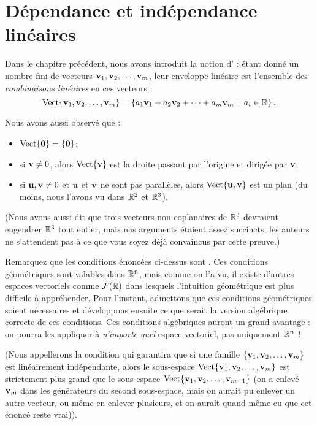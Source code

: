 \chapter{D\'ependance et ind\'ependance lin\'eaires}\label{chapter:Fr_07-independence}



Dans le chapitre pr\'ec\'edent, nous avons introduit la notion d' : étant donné un nombre fini de vecteurs $\mathbf{v}_1, \mathbf{v}_2, \ldots, \mathbf{v}_m$,
leur enveloppe lin\'eaire est l'ensemble des \emph{combinaisons linéaires} en ces vecteurs :
$$
\textrm{Vect}\{ \mathbf{v}_1, \mathbf{v}_2, \ldots, \mathbf{v}_m\} = \{ a_1\mathbf{v}_1 + a_2\mathbf{v}_2 + \cdots + a_m\mathbf{v}_m \, \mid \, a_i \in \mathbb{R}\}\,.
$$

Nous avons aussi observé que :
\begin{itemize}
\item  $\textrm{Vect}\{\mathbf{0}\} = \{ \mathbf{0}\}$;
\item si $\mathbf{v} \neq 0$, alors $\textrm{Vect}\{ \mathbf{v} \}$ est la droite passant par l'origine et dirig\'ee par $\mathbf{v}$;
\item si $\mathbf{u}, \mathbf{v} \neq 0$ et $\mathbf{u}$ et $\mathbf{v}$ ne sont pas parallèles, alors $\textrm{Vect}\{\mathbf{u},\mathbf{v}\}$ est un plan (du moins, nous l'avons vu dans $\mathbb{R}^2$ et $\mathbb{R}^3$).
\end{itemize}
(Nous avons aussi dit que trois vecteurs non coplanaires de $\mathbb{R}^3$ devraient engendrer $\mathbb{R}^3$ tout entier,
mais nos arguments étaient assez succincts, les auteurs ne s'attendent pas à ce 
que vous soyez déjà convaincus par cette preuve.)

Remarquez que les conditions énoncées ci-dessus sont . Ces conditions géométriques sont valables dans $\mathbb{R}^n$, mais comme on l'a vu, il existe d'autres espaces vectoriels comme $\mathcal{F}(\mathbb{R})$ dans lesquels l'intuition géométrique est plus difficile à appréhender. Pour l'instant,
admettons que ces conditions géométriques soient nécessaires et d\'eveloppons ensuite ce que serait
la version algébrique correcte de ces conditions. Ces conditions algébriques auront un grand avantage : on pourra les 
appliquer à \emph{n'importe quel} espace vectoriel, pas uniquement $\mathbb{R}^n$ !

(Nous appellerons 
 la condition qui garantira que si une famille $\{ \mathbf{v}_1, \mathbf{v}_2, \ldots, \mathbf{v}_m\}$ est linéairement
indépendante, alors le sous-espace $\textrm{Vect}\{\mathbf{v}_1, \mathbf{v}_2, \ldots, \mathbf{v}_m\}$ est 
strictement plus grand que le sous-espace $\textrm{Vect}\{\mathbf{v}_1, \mathbf{v}_2, \ldots, \mathbf{v}_{m-1}\}$
(on a enlevé $\mathbf{v}_m$ dans les générateurs du second sous-espace, mais on aurait pu enlever un autre vecteur, ou même en enlever plusieurs, et on aurait  quand même eu que cet énoncé reste vrai)).

